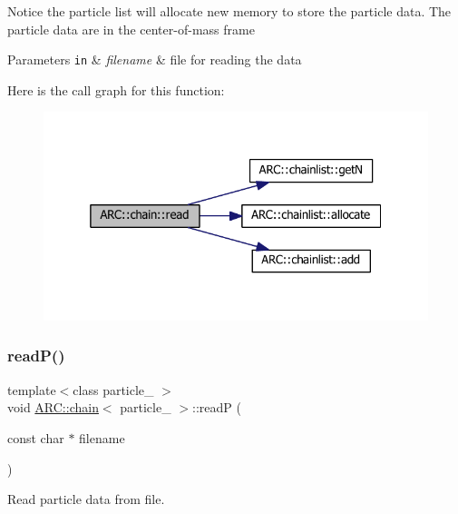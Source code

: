 Notice the particle list will allocate new memory to store the particle data. The particle data are in the center-\/of-\/mass frame 
\begin{DoxyParams}[1]{Parameters}
\mbox{\tt in}  & {\em filename} & file for reading the data \\
\hline
\end{DoxyParams}
Here is the call graph for this function\+:
\nopagebreak
\begin{figure}[H]
\begin{center}
\leavevmode
\includegraphics[width=325pt]{classARC_1_1chain_a3f328bce3650bab9496987bc5a1f5a98_cgraph}
\end{center}
\end{figure}
\hypertarget{classARC_1_1chain_a5325cc6945e9992b431450f7846e91e5}{}\label{classARC_1_1chain_a5325cc6945e9992b431450f7846e91e5} 
\subsubsection{\texorpdfstring{read\+P()}{readP()}}
{\footnotesize\ttfamily template$<$class particle\+\_\+ $>$ \\
void \hyperlink{classARC_1_1chain}{A\+R\+C\+::chain}$<$ particle\+\_\+ $>$\+::readP (\begin{DoxyParamCaption}\item[{const char $\ast$}]{filename }\end{DoxyParamCaption})\hspace{0.3cm}{\ttfamily [inline]}}



Read particle data from file. 

